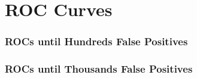\newpage
\section{ROC Curves}
\label{appendix:roc}

\subsubsection{ROCs until Hundreds False Positives}





\newpage\phantom{blabla}
\newpage\phantom{blabla}
\subsubsection{ROCs until Thousands False Positives}

